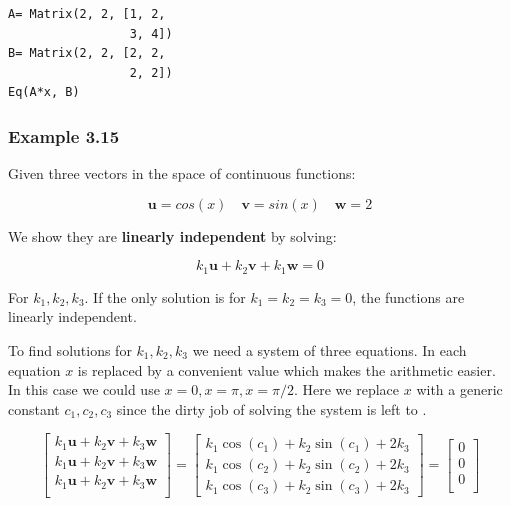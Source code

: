\begin{verbatim}
A= Matrix(2, 2, [1, 2,
                 3, 4])
B= Matrix(2, 2, [2, 2,
                 2, 2])
Eq(A*x, B)
\end{verbatim}

\subsubsection{Example 3.15}

Given three vectors in the space of continuous functions:

$$
\mathbf{u}= cos(x) \quad
\mathbf{v}= sin(x) \quad
\mathbf{w}= 2
$$

We show they are \textbf{linearly independent} by solving:

$$
k_1\mathbf{u} + k_2\mathbf{v} + k_1\mathbf{w}= 0
$$

For $k_1, k_2, k_3$. If the only solution is for $k_1 = k_2 = k_3 = 0$, the functions
are linearly independent.

To find solutions for $k_1, k_2, k_3$ we need a system of three equations.
In each equation $x$ is replaced by a convenient value which makes the arithmetic
easier. In this case we could use $x= 0, x= \pi, x= \pi/2$. Here we replace $x$ with
a generic constant $c_1, c_2, c_3$ since the dirty job of solving the system is left
to \sympy.

$$
\left[\begin{matrix}
k_{1} \mathbf{u} + k_{2} \mathbf{v} + k_3 \mathbf{w} \\
k_{1} \mathbf{u} + k_{2} \mathbf{v} + k_3 \mathbf{w} \\
k_{1} \mathbf{u} + k_{2} \mathbf{v} + k_3 \mathbf{w} \\
\end{matrix}\right]
=
\left[\begin{matrix}
k_{1} \cos{\left (c_{1} \right )} + k_{2} \sin{\left (c_{1} \right )} + 2 k_{3} \\
k_{1} \cos{\left (c_{2} \right )} + k_{2} \sin{\left (c_{2} \right )} + 2 k_{3} \\
k_{1} \cos{\left (c_{3} \right )} + k_{2} \sin{\left (c_{3} \right )} + 2 k_{3}
\end{matrix}\right]
=
\left[\begin{matrix}
0 \\
0 \\
0 \\
\end{matrix}\right]
$$

